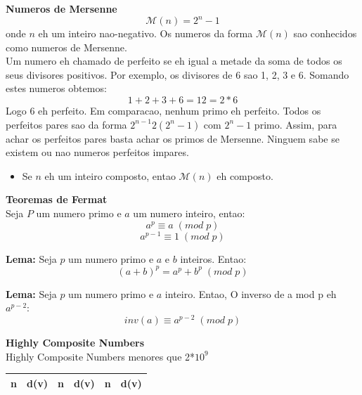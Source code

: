 \documentclass[10pt, twocolumn]{article}
\begin{document}
\begin{flushleft}
\textbf{Numeros de Mersenne}\\
$$\mathcal{M}(n) = 2^{n} - 1$$
onde $n$ eh um inteiro nao-negativo. Os numeros da forma $\mathcal{M}(n)$ sao conhecidos como numeros de Mersenne.\\
Um numero eh chamado de perfeito  se eh igual a metade da soma de todos os seus divisores positivos. Por exemplo, os divisores de 6 sao 1, 2, 3 e 6. Somando estes numeros obtemos:
$$1+2+3+6 = 12 = 2*6$$
Logo 6 eh perfeito. Em comparacao, nenhum primo eh perfeito. Todos os perfeitos pares sao da forma $2^{n-1}2(2^n - 1)$ com $2^n - 1$ primo. Assim, para achar os perfeitos pares basta achar os primos de Mersenne. Ninguem sabe se existem ou nao numeros perfeitos impares.
\begin{itemize}
\item Se $n$ eh um inteiro composto, entao $\mathcal{M}(n)$ eh composto.
\end{itemize}
\vspace{0.5cm}


\textbf{Teoremas de Fermat}\\
Seja $P$ um numero primo e $a$ um numero inteiro, entao:
$$a^p \equiv a \; (mod \; p)$$
$$a^{p-1} \equiv 1 \; (mod \; p)$$

\textbf{Lema:} Seja $p$ um numero primo e $a$ e $b$ inteiros. Entao:
$$(a+b)^{p} = a^{p} + b^{p} \; (mod \; p)$$

\textbf{Lema:} Seja $p$ um numero primo e $a$ inteiro. Entao, O inverso de a mod p eh $a^{p-2}$:
$$inv(a) \equiv a^{p-2} \; (mod \; p)$$


\textbf{Highly Composite Numbers}\\

Highly Composite Numbers menores que 2*$10^9$
\begin{center}
{\tabulinesep=1.2mm
\begin{tabu}[H]{|a|c|a|c|a|c|}

\hline
n & d(v) & n & d(v) & n & d(v)\\
\hline


\end{tabu}}
\end{center}
\end{flushleft}
\end{document}
